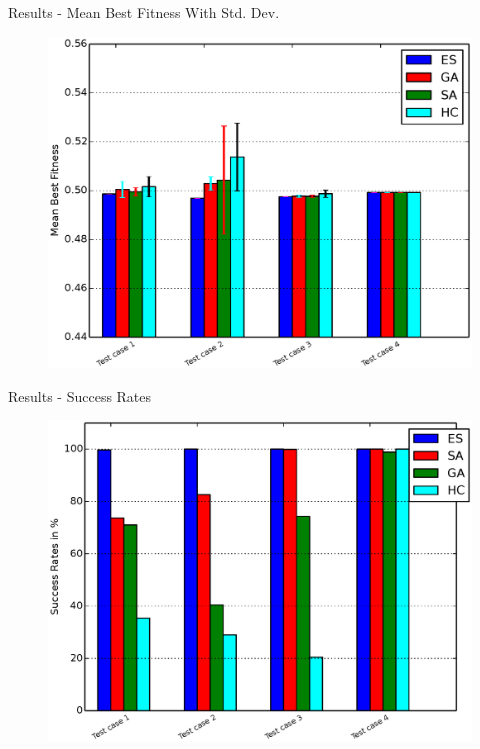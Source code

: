 \documentclass{beamer}
\begin{document}
\begin{frame}{Results - Mean Best Fitness With Std. Dev.}
    \begin{figure}
        \vspace*{-0.35cm}
        \centering
        \includegraphics[scale=0.48]{../paper/FIG/tc_mfwerr}
    \end{figure}
\end{frame}

\begin{frame}{Results - Success Rates}
    \begin{figure}
        \vspace*{-0.35cm}
        \centering
        \includegraphics[scale=0.48]{../paper/FIG/tc_sp}
    \end{figure}
\end{frame}
\end{document}
